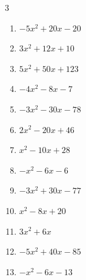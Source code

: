 \begin{multicols}{3}
\begin{enumerate}
  \item $-5x^{2}+20x-20$


  \item $3x^{2}+12x+10$


  \item $5x^{2}+50x+123$


  \item $-4x^{2}-8x-7$


  \item $-3x^{2}-30x-78$


  \item $2x^{2}-20x+46$


\columnbreak %

\resetques

  \item $x^{2}-10x+28$


  \item $-x^{2}-6x-6$


  \item $-3x^{2}+30x-77$


  \item $x^{2}-8x+20$


  \item $3x^{2}+6x$


  \item $-5x^{2}+40x-85$


  \item $-x^{2}-6x-13$



\end{enumerate}
\end{multicols}
